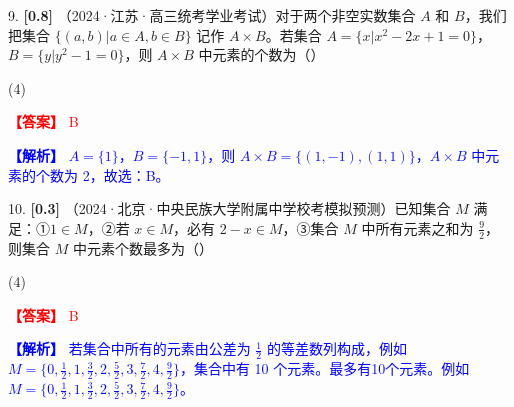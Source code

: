 \documentclass[11pt,a4paper]{article}
\begin{document}
\vspace{0.5cm}

9. \textbf{[0.8]} （2024·江苏·高三统考学业考试）对于两个非空实数集合 $A$ 和 $B$，我们把集合 $\{(a,b)|a \in A, b \in B\}$ 记作 $A \times B$。若集合 $A=\{x|x^2-2x+1=0\}$，$B=\{y|y^2-1=0\}$，则 $A \times B$ 中元素的个数为（\quad）

\begin{tasks}(4)
\end{tasks}

\par\noindent\textcolor{red}{\textbf{【答案】} B}
\par\noindent\textcolor{blue}{\textbf{【解析】} $A=\{1\}$，$B=\{-1,1\}$，则 $A \times B=\{(1,-1),(1,1)\}$，$A \times B$ 中元素的个数为 2，故选：B。}

\vspace{0.5cm}

10. \textbf{[0.3]} （2024·北京·中央民族大学附属中学校考模拟预测）已知集合 $M$ 满足：①$1 \in M$，②若 $x \in M$，必有 $2-x \in M$，③集合 $M$ 中所有元素之和为 $\frac{9}{2}$，则集合 $M$ 中元素个数最多为（\quad）

\begin{tasks}(4)
\end{tasks}

\par\noindent\textcolor{red}{\textbf{【答案】} B}
\par\noindent\textcolor{blue}{\textbf{【解析】} 若集合中所有的元素由公差为 $\frac{1}{2}$ 的等差数列构成，例如 $M=\{0, \frac{1}{2}, 1, \frac{3}{2}, 2, \frac{5}{2}, 3, \frac{7}{2}, 4, \frac{9}{2}\}$，集合中有 10 个元素。最多有10个元素。例如 $M=\{0, \frac{1}{2}, 1, \frac{3}{2}, 2, \frac{5}{2}, 3, \frac{7}{2}, 4, \frac{9}{2}\}$。}

\vspace{0.5cm}
\end{document}
